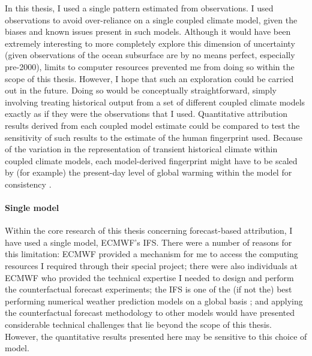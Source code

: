     In this thesis, I used a single pattern estimated from observations. I used observations to avoid over-reliance on a single coupled climate model, given the biases and known issues present in such models. Although it would have been extremely interesting to more completely explore this dimension of uncertainty (given observations of the ocean subsurface are by no means perfect, especially pre-2000), limits to computer resources prevented me from doing so within the scope of this thesis. However, I hope that such an exploration could be carried out in the future. Doing so would be conceptually straightforward, simply involving treating historical output from a set of different coupled climate models exactly as if they were the observations that I used. Quantitative attribution results derived from each coupled model estimate could be compared to test the sensitivity of such results to the estimate of the human fingerprint used. Because of the variation in the representation of transient historical climate within coupled climate models, each model-derived fingerprint might have to be scaled by (for example) the present-day level of global warming within the model for consistency \citep{tokarska_past_2020}.

  \paragraph*{Single model}

    Within the core research of this thesis concerning forecast-based attribution, I have used a single model, ECMWF's IFS. There were a number of reasons for this limitation: ECMWF provided a mechanism for me to access the computing resources I required through their special project; there were also individuals at ECMWF who provided the technical expertise I needed to design and perform the counterfactual forecast experiments; the IFS is one of the (if not the) best performing numerical weather prediction models on a global basis \citep{hagedorn_comparing_2012}; and applying the counterfactual forecast methodology to other models would have presented considerable technical challenges that lie beyond the scope of this thesis. However, the quantitative results presented here may be sensitive to this choice of model. 
    
